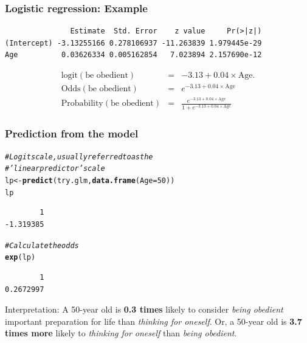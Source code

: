 \documentclass{beamer}\usepackage[]{graphicx}\usepackage[]{color}
\makeatletter
\newcommand{\hlnum}[1]{\textcolor[rgb]{0.686,0.059,0.569}{#1}}%
\newcommand{\hlcom}[1]{\textcolor[rgb]{0.678,0.584,0.686}{\textit{#1}}}%
\newcommand{\hlstd}[1]{\textcolor[rgb]{0.345,0.345,0.345}{#1}}%
\newcommand{\hlkwb}[1]{\textcolor[rgb]{0.69,0.353,0.396}{#1}}%
\newcommand{\hlkwc}[1]{\textcolor[rgb]{0.333,0.667,0.333}{#1}}%
\newcommand{\hlkwd}[1]{\textcolor[rgb]{0.737,0.353,0.396}{\textbf{#1}}}%
\newenvironment{kframe}{%
 \def\at@end@of@kframe{}%
 \ifinner\ifhmode%
  \def\at@end@of@kframe{\end{minipage}}%
  \begin{minipage}{\columnwidth}%
 \fi\fi%
 \def\FrameCommand##1{\hskip\@totalleftmargin \hskip-\fboxsep
 \colorbox{shadecolor}{##1}\hskip-\fboxsep
     \hskip-\linewidth \hskip-\@totalleftmargin \hskip\columnwidth}%
 \MakeFramed {\advance\hsize-\width
   \@totalleftmargin\z@ \linewidth\hsize
   \@setminipage}}%
 {\par\unskip\endMakeFramed%
 \at@end@of@kframe}
\newenvironment{knitrout}{}{} %
\makeatother
\begin{document}
\begin{frame}[fragile]
\frametitle{Logistic regression: Example}
\begin{knitrout}
\color{fgcolor}\begin{kframe}
\begin{verbatim}
               Estimate  Std. Error    z value     Pr(>|z|)
(Intercept) -3.13255166 0.278106937 -11.263839 1.979445e-29
Age          0.03626334 0.005162854   7.023894 2.157690e-12
\end{verbatim}
\end{kframe}
\end{knitrout}
\begin{eqnarray*}
\text{logit}(\text{be obedient}) & = & -3.13 + 0.04 \times \text{Age}.\\
\text{Odds}(\text{be obedient}) & = & e^{-3.13 + 0.04 \times \text{Age}}\\
\text{Probability}(\text{be obedient}) & = & \frac{e^{-3.13 + 0.04 \times \text{Age}}}{1 + e^{-3.13 + 0.04 \times \text{Age}}}
\end{eqnarray*}
\end{frame}

\begin{frame}[fragile]
\frametitle{Prediction from the model}
\begin{knitrout}
\color{fgcolor}\begin{kframe}
\begin{alltt}
\hlcom{# Logit scale, usually referred to as the }
\hlcom{# 'linear predictor' scale}
\hlstd{lp} \hlkwb{<-} \hlkwd{predict}\hlstd{(try.glm,} \hlkwd{data.frame}\hlstd{(}\hlkwc{Age} \hlstd{=} \hlnum{50}\hlstd{))}
\hlstd{lp}
\end{alltt}
\begin{verbatim}
        1 
-1.319385 
\end{verbatim}
\begin{alltt}
\hlcom{# Calculate the odds}
\hlkwd{exp}\hlstd{(lp)}
\end{alltt}
\begin{verbatim}
        1 
0.2672997 
\end{verbatim}
\end{kframe}
\end{knitrout}
Interpretation: A 50-year old is \textbf{0.3 times} likely to consider {\em being obedient} important preparation for life than {\em thinking for oneself}. Or, a 50-year old is \textbf{3.7 times more} likely to {\em thinking for oneself} than {\em being obedient}.
\end{frame}
\end{document}

